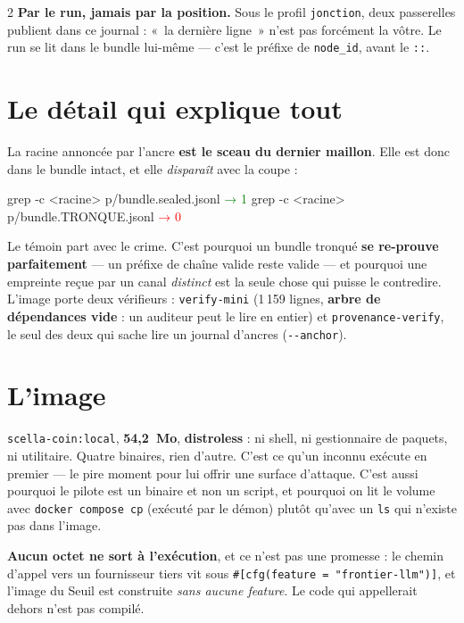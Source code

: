\documentclass[9pt]{extarticle}
\newcommand{\code}[1]{\texttt{\footnotesize #1}}
\begin{document}
\begin{multicols}{2}
\textbf{Par le run, jamais par la position.} Sous le profil \code{jonction}, deux passerelles
publient dans ce journal : «~la dernière ligne~» n'est pas forcément la vôtre. Le run se lit dans
le bundle lui-même --- c'est le préfixe de \code{node\_id}, avant le \code{::}.

\section{Le détail qui explique tout}
La racine annoncée par l'ancre \textbf{est le sceau du dernier maillon}. Elle est donc dans le
bundle intact, et elle \emph{disparaît} avec la coupe :

\begin{cmd}
grep -c <racine> p/bundle.sealed.jsonl  \textcolor{green}{→ 1}
grep -c <racine> p/bundle.TRONQUE.jsonl \textcolor{red}{→ 0}
\end{cmd}

Le témoin part avec le crime. C'est pourquoi un bundle tronqué \textbf{se re-prouve
parfaitement} --- un préfixe de chaîne valide reste valide --- et pourquoi une empreinte reçue
par un canal \emph{distinct} est la seule chose qui puisse le contredire. L'image porte deux
vérifieurs : \code{verify-mini} (1\,159 lignes, \textbf{arbre de dépendances vide} : un auditeur
peut le lire en entier) et \code{provenance-verify}, le seul des deux qui sache lire un journal
d'ancres (\code{-{}-anchor}).

\section{L'image}
\code{scella-coin:local}, \textbf{54,2~Mo}, \textbf{distroless} : ni shell, ni gestionnaire de
paquets, ni utilitaire. Quatre binaires, rien d'autre. C'est ce qu'un inconnu exécute en premier
--- le pire moment pour lui offrir une surface d'attaque. C'est aussi pourquoi le pilote est un
binaire et non un script, et pourquoi on lit le volume avec \code{docker compose cp} (exécuté par
le démon) plutôt qu'avec un \code{ls} qui n'existe pas dans l'image.

\smallskip
\textbf{Aucun octet ne sort à l'exécution}, et ce n'est pas une promesse : le chemin d'appel vers
un fournisseur tiers vit sous \code{\#[cfg(feature = "frontier-llm")]}, et l'image du Seuil est
construite \emph{sans aucune feature}. Le code qui appellerait dehors n'est pas compilé.

\end{multicols}
\end{document}
